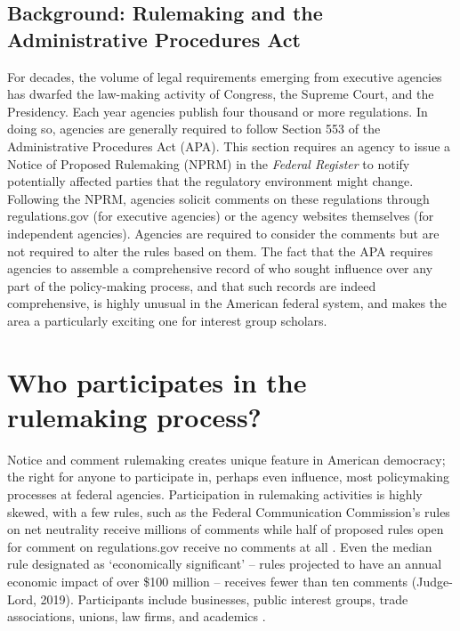 \documentclass[12pt,notitlepage]{article}
\newcounter{cor}
\begin{document}
\hypertarget{background-rulemaking-and-the-administrative-procedures-act}{%
\subsection*{Background: Rulemaking and the Administrative Procedures
Act}\label{background-rulemaking-and-the-administrative-procedures-act}}

For decades, the volume of legal requirements emerging from executive
agencies has dwarfed the law-making activity of Congress, the Supreme
Court, and the Presidency. Each year agencies publish four thousand or
more regulations. In doing so, agencies are generally required to follow
Section 553 of the Administrative Procedures Act (APA). This section
requires an agency to issue a Notice of Proposed Rulemaking (NPRM) in
the \emph{Federal Register} to notify potentially affected parties that
the regulatory environment might change. Following the NPRM, agencies
solicit comments on these regulations through regulations.gov (for
executive agencies) or the agency websites themselves (for independent
agencies). Agencies are required to consider the comments but are not
required to alter the rules based on them. The fact that the APA
requires agencies to assemble a comprehensive record of who sought
influence over any part of the policy-making process, and that such
records are indeed comprehensive, is highly unusual in the American
federal system, and makes the area a particularly exciting one for
interest group scholars.

\hypertarget{who-participates-in-the-rulemaking-process}{%
\section{Who participates in the rulemaking
process?}\label{who-participates-in-the-rulemaking-process}}

Notice and comment rulemaking creates unique feature in American
democracy; the right for anyone to participate in, perhaps even
influence, most policymaking processes at federal agencies.
Participation in rulemaking activities is highly skewed, with a few
rules, such as the Federal Communication Commission's rules on net
neutrality receive millions of comments while half of proposed rules
open for comment on regulations.gov receive no comments at all
\citep{Libgober_JOP}. Even the median rule designated as `economically
significant' -- rules projected to have an annual economic impact of
over \$100 million -- receives fewer than ten comments (Judge-Lord,
2019). Participants include businesses, public interest groups, trade
associations, unions, law firms, and academics
\citep{Cuellar_ALR_2005, Yackee_JOP_2006}.
\end{document}
